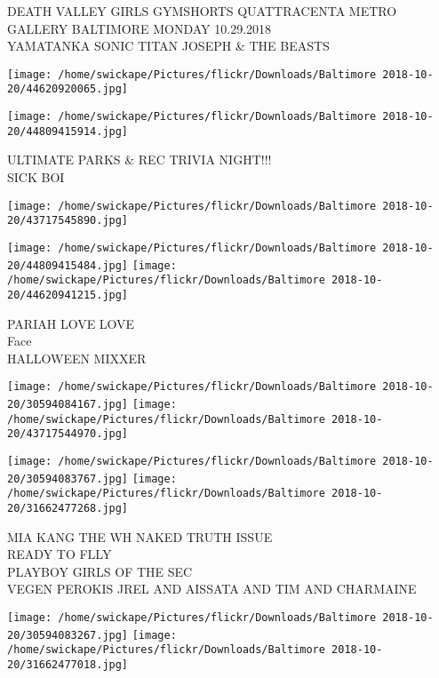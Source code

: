 \documentclass[10pt,letterpaper]{article}
\begin{document}
DEATH VALLEY GIRLS GYMSHORTS QUATTRACENTA METRO GALLERY BALTIMORE MONDAY 10.29.2018\\
YAMATANKA SONIC TITAN JOSEPH \& THE BEASTS\\
\pagebreak

\texttt{[image: /home/swickape/Pictures/flickr/Downloads/Baltimore 2018-10-20/44620920065.jpg]}

\vspace{0.25in}
\texttt{[image: /home/swickape/Pictures/flickr/Downloads/Baltimore 2018-10-20/44809415914.jpg]}

ULTIMATE PARKS \& REC TRIVIA NIGHT!!!\\
SICK BOI\\
\pagebreak

\texttt{[image: /home/swickape/Pictures/flickr/Downloads/Baltimore 2018-10-20/43717545890.jpg]}

\vspace{0.25in}
\texttt{[image: /home/swickape/Pictures/flickr/Downloads/Baltimore 2018-10-20/44809415484.jpg]}
\texttt{[image: /home/swickape/Pictures/flickr/Downloads/Baltimore 2018-10-20/44620941215.jpg]}

PARIAH LOVE LOVE\\
Face\\
HALLOWEEN MIXXER\\
\pagebreak

\texttt{[image: /home/swickape/Pictures/flickr/Downloads/Baltimore 2018-10-20/30594084167.jpg]}
\texttt{[image: /home/swickape/Pictures/flickr/Downloads/Baltimore 2018-10-20/43717544970.jpg]}

\texttt{[image: /home/swickape/Pictures/flickr/Downloads/Baltimore 2018-10-20/30594083767.jpg]}
\texttt{[image: /home/swickape/Pictures/flickr/Downloads/Baltimore 2018-10-20/31662477268.jpg]}

MIA KANG THE WH NAKED TRUTH ISSUE\\
READY TO FLLY\\
PLAYBOY GIRLS OF THE SEC\\
VEGEN PEROKIS JREL AND AISSATA AND TIM AND CHARMAINE\\
\pagebreak

\texttt{[image: /home/swickape/Pictures/flickr/Downloads/Baltimore 2018-10-20/30594083267.jpg]}
\texttt{[image: /home/swickape/Pictures/flickr/Downloads/Baltimore 2018-10-20/31662477018.jpg]}
\end{document}
